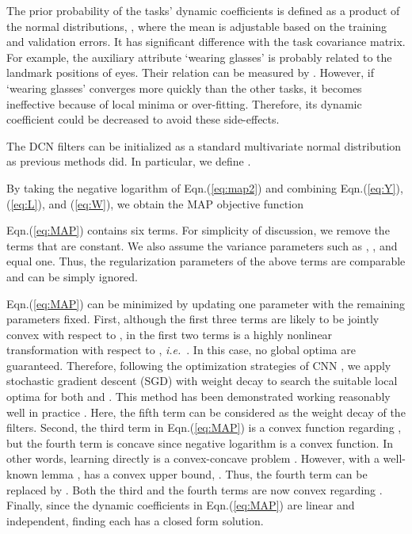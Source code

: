 \documentclass[10pt,journal,compsoc]{IEEEtran}
\newcommand{\ie}{\emph{i.e.}~}
\begin{document}
 The prior probability of the tasks' dynamic coefficients is defined as a product of the normal
distributions, , where the mean is adjustable based on the training and validation errors. It has significant difference with the task covariance matrix.
For example, the auxiliary attribute `wearing glasses' is probably related to the landmark positions of eyes. Their relation can be measured by . However, if `wearing glasses' converges more quickly than the other tasks, it becomes ineffective because of local minima or over-fitting. Therefore, its dynamic coefficient could be decreased to avoid these side-effects.

 The DCN filters can be initialized as a standard multivariate normal distribution as previous methods \cite{krizhevsky2012imagenet} did. In particular, we define .

By taking the negative logarithm of Eqn.(\ref{eq:map2}) and combining Eqn.(\ref{eq:Y}), (\ref{eq:L}), and (\ref{eq:W}), we obtain the MAP objective function

Eqn.(\ref{eq:MAP}) contains six terms. For simplicity of discussion, we remove the terms that are constant. We also assume the variance parameters such as , , and  equal one. Thus, the regularization parameters of the above terms are comparable and can be simply ignored.

Eqn.(\ref{eq:MAP}) can be minimized by updating one parameter with the remaining parameters fixed.
First, although the first three terms are likely to be jointly convex with respect to ,  in the first two terms is a highly nonlinear transformation with respect to , \ie .
In this case, no global optima are guaranteed. Therefore, following the optimization strategies of CNN \cite{lecun1998gradient}, we apply stochastic gradient descent (SGD) \cite{krizhevsky2012imagenet} with weight decay \cite{moody1995simple} to search the suitable local optima for both  and .
This method has been demonstrated working reasonably well in practice \cite{krizhevsky2012imagenet}.
Here, the fifth term can be considered as the weight decay of the filters.
Second, the third term in Eqn.(\ref{eq:MAP}) is a convex function regarding , but the fourth term is concave since negative logarithm is a convex function.
In other words, learning  directly is a convex-concave problem \cite{yuille2002concave}.
However, with a well-known lemma \cite{boyd2004convex},  has a convex upper bound, . Thus, the fourth term can be replaced by . Both the third and the fourth terms are now convex regarding .
Finally, since the dynamic coefficients in Eqn.(\ref{eq:MAP}) are linear and independent, finding each  has a closed form solution.
\end{document}

